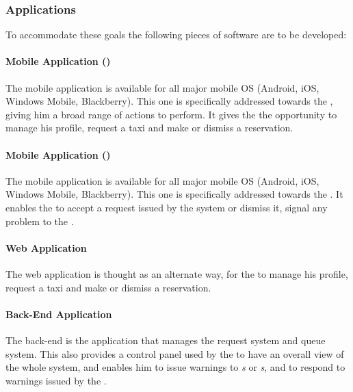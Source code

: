 \subsubsection{Applications} %
\label{ssub:applications}
To accommodate these goals the following pieces of software are to be developed:

\paragraph{Mobile Application (\emph{})}
\label{app:mobileuser}
  The mobile application is available for all major mobile OS (Android, iOS, Windows Mobile, Blackberry).
  This one is specifically addressed towards the \emph{}, giving him a broad range of actions to perform.
  It gives the \emph{} the opportunity to manage his profile, request a taxi and make or dismiss a reservation. %

\paragraph{Mobile Application (\emph{})} %
  \label{app:mobiledriver}
  The mobile application is available for all major mobile OS (Android, iOS, Windows Mobile, Blackberry).
  This one is specifically addressed towards the \emph{}.
  It enables the \emph{} to accept a request issued by the system or dismiss it, signal any problem to the \emph{}.

\paragraph{Web Application} %
  \label{app:web}
  The web application is thought as an alternate way, for the \emph{} to manage his profile, request a taxi and make or dismiss a reservation.

\paragraph{Back-End Application} %
  \label{app:backend}
  The back-end is the application that manages the request system and queue system. This also provides a control panel used by the \emph{} to have an overall view of the whole system, and enables him to issue warnings to \emph{s} or \emph{s}, and to respond to warnings issued by the \emph{}.
